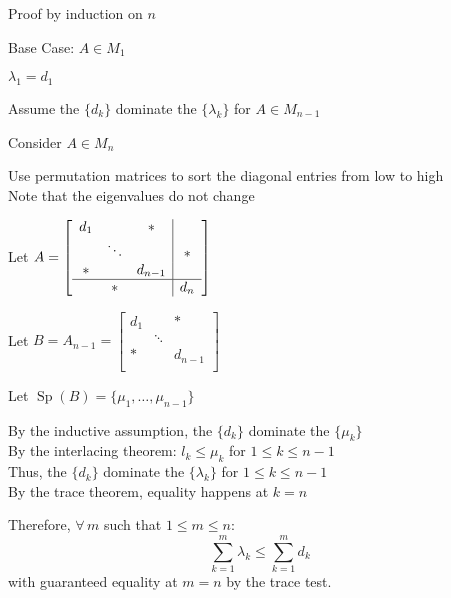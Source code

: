 \documentclass[letterpaper,12pt,fleqn]{article}
\renewcommand{\l}{\lambda}
\DeclareMathOperator{\Sp}{Sp}
\begin{document}
\begin{theproof}
  Proof by induction on $n$

  \begin{description}
  \item Base Case: $A\in M_1$

    $\l_1=d_1$

  \item Assume the $\{d_k\}$ dominate the $\{\l_k\}$ for $A\in M_{n-1}$

  \item Consider $A\in M_n$

    Use permutation matrices to sort the diagonal entries from low to high \\
    Note that the eigenvalues do not change

    Let $A=\left[\begin{array}{ccc|c}
        d_1 & & * & \\
        & \ddots & & * \\
        * & & d_{n-1} & \\
        \hline
        & * & & d_n
      \end{array}\right]$

    Let $B=A_{n-1}=\begin{bmatrix}
        d_1 & & * \\
        & \ddots & \\
        * & & d_{n-1} \\
    \end{bmatrix}$

    Let $\Sp(B)=\{\mu_1,\ldots,\mu_{n-1}\}$

    By the inductive assumption, the $\{d_k\}$ dominate the $\{\mu_k\}$ \\
    By the interlacing theorem: $l_k\le\mu_k$ for $1\le k\le n-1$ \\
    Thus, the $\{d_k\}$ dominate the $\{\l_k\}$ for $1\le k\le n-1$ \\
    By the trace theorem, equality happens at $k=n$

    Therefore, $\forall\,m$ such that $1\le m\le n$:
    \[\sum_{k=1}^m\l_k\le\sum_{k=1}^md_k\]
    with guaranteed equality at $m=n$ by the trace test.
  \end{description}
\end{theproof}
\end{document}
